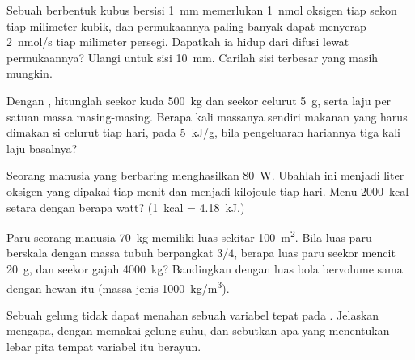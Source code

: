 \begin{exercise}[$\star\star$]\label{exo:b1:organism-environment:5}
Sebuah  berbentuk kubus bersisi \qty{1}{mm} memerlukan
\qty{1}{nmol} oksigen tiap sekon tiap milimeter kubik, dan permukaannya
paling banyak dapat menyerap \qty{2}{nmol/s} tiap milimeter persegi.
Dapatkah ia hidup dari difusi lewat permukaannya? Ulangi untuk sisi
\qty{10}{mm}. Carilah sisi terbesar yang masih mungkin.
\end{exercise}

\begin{exercise}[$\star\star$]\label{exo:b1:organism-environment:6}
Dengan , hitunglah  seekor kuda
\qty{500}{kg} dan seekor celurut \qty{5}{g}, serta laju per satuan massa
masing-masing. Berapa kali massanya sendiri makanan yang harus dimakan
si celurut tiap hari, pada \qty{5}{kJ/g}, bila pengeluaran hariannya
tiga kali laju basalnya?
\end{exercise}

\begin{exercise}[$\star\star$]\label{exo:b1:organism-environment:7}
Seorang manusia yang berbaring menghasilkan \qty{80}{W}. Ubahlah ini
menjadi liter oksigen yang dipakai tiap menit dan menjadi kilojoule tiap
hari. Menu \qty{2000}{kcal} setara dengan berapa watt?
(\qty{1}{kcal} = \qty{4.18}{kJ}.)
\end{exercise}

\begin{exercise}[$\star\star$]\label{exo:b1:organism-environment:8}
Paru seorang manusia \qty{70}{kg} memiliki luas 
sekitar \qty{100}{m^2}. Bila luas paru berskala dengan massa tubuh
berpangkat $3/4$, berapa luas paru seekor mencit \qty{20}{g}, dan seekor
gajah \qty{4000}{kg}? Bandingkan dengan luas bola bervolume sama dengan
hewan itu (massa jenis \qty{1000}{kg/m^3}).
\end{exercise}

\begin{exercise}[$\star\star$]\label{exo:b1:organism-environment:9}
Sebuah gelung  tidak dapat menahan sebuah variabel
tepat pada . Jelaskan mengapa, dengan memakai gelung suhu,
dan sebutkan apa yang menentukan lebar pita tempat variabel itu berayun.
\end{exercise}

